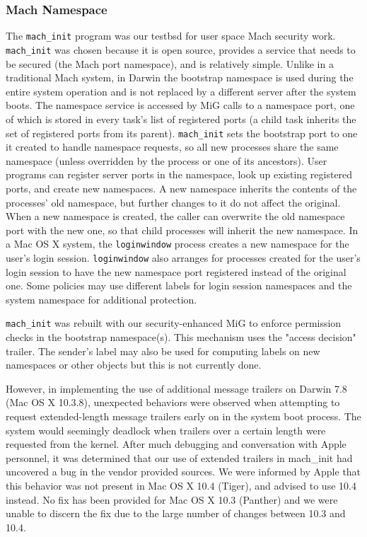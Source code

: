 \subsubsection{Mach Namespace}

The {\tt mach\_init} program was our testbsd for user space Mach
security work. {\tt mach\_init} was chosen because it is open source,
provides a service that needs to be secured (the Mach port namespace),
and is relatively simple.  Unlike in a traditional Mach system, in
Darwin the bootstrap namespace is used during the entire system
operation and is not replaced by a different server after the system
boots. The namespace service is accessed by MiG calls to a namespace
port, one of which is stored in every task's list of registered
ports (a child task inherits the set of registered ports from its
parent). {\tt mach\_init} sets the bootstrap port to one it created
to handle namespace requests, so all new processes share the same
namespace (unless overridden by the process or one of its ancestors).
User programs can register server ports in the namespace, look up
existing registered ports, and create new namespaces. A new namespace
inherits the contents of the processes' old namespace, but further
changes to it do not affect the original. When a new namespace is
created, the caller can overwrite the old namespace port with the
new one, so that child processes will inherit the new namespace.
In a Mac OS X system, the {\tt loginwindow} process creates a new
namespace for the user's login session.  {\tt loginwindow} also
arranges for processes created for the user's login session to have
the new namespace port registered instead of the original one.  Some
policies may use different labels for login session namespaces and
the system namespace for additional protection.

{\tt mach\_init} was rebuilt with our security-enhanced MiG to
enforce permission checks in the bootstrap namespace(s). This
mechanism uses the "access decision" trailer. The sender's label
may also be used for computing labels on new namespaces or other
objects but this is not currently done.

However, in implementing the use of additional message trailers on
Darwin 7.8 (Mac OS X 10.3.8), unexpected behaviors were observed
when attempting to request extended-length message trailers early
on in the system boot process. The system would seemingly deadlock
when trailers over a certain length were requested from the kernel.
After much debugging and conversation with Apple personnel, it was
determined that our use of extended trailers in mach\_init had
uncovered a bug in the vendor provided sources. We were informed
by Apple that this behavior was not present in Mac OS X 10.4 (Tiger),
and advised to use 10.4 instead.  No fix has been provided for Mac
OS X 10.3 (Panther) and we were unable to discern the fix due to
the large number of changes between 10.3 and 10.4.

